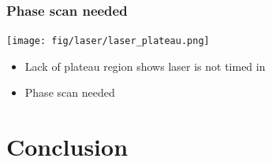 \documentclass[bigger]{beamer}
\begin{document}
\begin{frame}
\frametitle{Phase scan needed}
\label{sec-4-2-3}
\label{sec-4-2-3-1}

\centering
\texttt{[image: fig/laser/laser\_plateau.png]}
\begin{itemize}

\item Lack of plateau region shows laser is not timed in
\label{sec-4-2-3-2}%

\item Phase scan needed
\label{sec-4-2-3-3}%
\end{itemize} %
\end{frame}
\section{Conclusion}
\label{sec-5}
\end{document}

